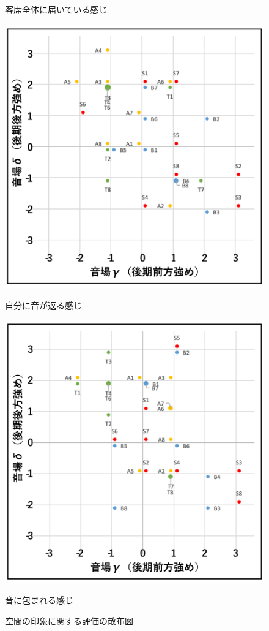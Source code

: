 \documentclass[11pt,a4j]{jreport}
\begin{document}
\begin{figure}[H]
\begin{minipage}{0.5\linewidth}
    \caption*{客席全体に届いている感じ}
  \end{minipage}
  \begin{minipage}{.5\linewidth}
    \centering
    \includegraphics[width=.9\linewidth]{images/subjectiveExp/scat_late_06returnSelf.pdf}
    \caption*{自分に音が返る感じ}
  \end{minipage}%
  \begin{minipage}{.5\linewidth}
    \centering
    \includegraphics[width=.9\linewidth]{images/subjectiveExp/scat_late_07surrounded.pdf}
    \caption*{音に包まれる感じ}
  \end{minipage}

  \caption{空間の印象に関する評価の散布図}
  \label{fig:空間の印象に関する評価の散布図}
\end{figure}
\end{document}
